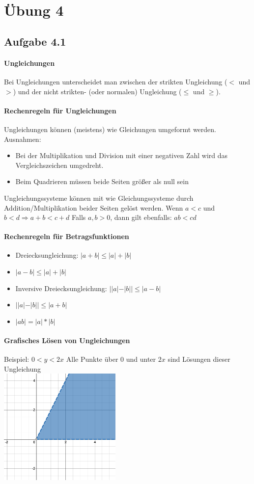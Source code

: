 \documentclass{standalone}
\begin{document}
 
\section{Übung 4}
\subsection{Aufgabe 4.1}
\paragraph{Ungleichungen}
Bei Ungleichungen unterscheidet man zwischen der strikten Ungleichung ($<$ und $>$) und der nicht strikten- (oder normalen) Ungleichung ($\leqslant$ und $\geqslant$).
\paragraph{Rechenregeln für Ungleichungen}
Ungleichungen können (meistens) wie Gleichungen umgeformt werden. Ausnahmen:
\begin{itemize}
\item Bei der Multiplikation und Division mit einer negativen Zahl wird das Vergleichszeichen umgedreht. 
\item Beim Quadrieren müssen beide Seiten größer als null sein
\end{itemize}
Ungleichungssysteme können mit wie Gleichungssysteme durch Addition/Multiplikation beider Seiten gelöst werden. Wenn
$a < c$ und $b < d \Rightarrow a+b < c + d$ Falls $a, b > 0$, dann gilt ebenfalls: $ab < cd$ \\
\paragraph{Rechenregeln für Betragsfunktionen}
\begin{itemize}
\item Dreiecksungleichung: $|a + b| \leqslant |a| + |b|$
\item $|a - b| \leqslant |a| + |b|$
\item Inversive Dreiecksungleichung: $||a| - |b|| \leqslant |a - b|$
\item $||a| - |b|| \leqslant |a + b|$
\item $|ab| = |a| * |b|$
\end{itemize}
\paragraph{Grafisches Lösen von Ungleichungen}
Beispiel:
$0 < y < 2x$ Alle Punkte über 0 und unter $2x$ sind Lösungen dieser Ungleichung \\
\includegraphics[width=6cm]{img/4_1.png}
\end{document}
